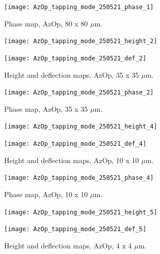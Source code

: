 \begin{figure}[H]
\centering
  \texttt{[image: AzOp\_tapping\_mode\_250521\_phase\_1]}
\caption[Phase map, AzOp]{Phase map, AzOp, 80 x 80 $\mu$m.}
\label{fig:afm_azop_phase_1}
\end{figure}


\begin{figure}[H]
\centering
\begin{minipage}{.45\textwidth}
  \centering
  \texttt{[image: AzOp\_tapping\_mode\_250521\_height\_2]}
\end{minipage}
\begin{minipage}{.45\textwidth}
  \centering
  \texttt{[image: AzOp\_tapping\_mode\_250521\_def\_2]}
\end{minipage}
\caption[Height and deflection maps, AzOp]{Height and deflection maps, AzOp, 35 x 35 $\mu$m.}
\label{fig:afm_azop_height_def_2}
\end{figure}

\begin{figure}[H]
\centering
  \texttt{[image: AzOp\_tapping\_mode\_250521\_phase\_2]}
\caption[Phase map, AzOp]{Phase map, AzOp, 35 x 35 $\mu$m.}
\label{fig:afm_azop_phase_2}
\end{figure}


\begin{figure}[H]
\centering
\begin{minipage}{.45\textwidth}
  \centering
  \texttt{[image: AzOp\_tapping\_mode\_250521\_height\_4]}
\end{minipage}
\begin{minipage}{.45\textwidth}
  \centering
  \texttt{[image: AzOp\_tapping\_mode\_250521\_def\_4]}
\end{minipage}
\caption[Height and deflection maps, AzOp]{Height and deflection maps, AzOp, 10 x 10 $\mu$m.}
\label{fig:afm_azop_height_def_3}
\end{figure}

\begin{figure}[H]
\centering
  \texttt{[image: AzOp\_tapping\_mode\_250521\_phase\_4]}
\caption[Phase map, AzOp]{Phase map, AzOp, 10 x 10 $\mu$m.}
\label{fig:afm_azop_phase_3}
\end{figure}


\begin{figure}[H]
\centering
\begin{minipage}{.45\textwidth}
  \centering
  \texttt{[image: AzOp\_tapping\_mode\_250521\_height\_5]}
\end{minipage}
\begin{minipage}{.45\textwidth}
  \centering
  \texttt{[image: AzOp\_tapping\_mode\_250521\_def\_5]}
\end{minipage}
\caption[Height and deflection maps, AzOp]{Height and deflection maps, AzOp, 4 x 4 $\mu$m.}
\label{fig:afm_azop_height_def_4}
\end{figure}

